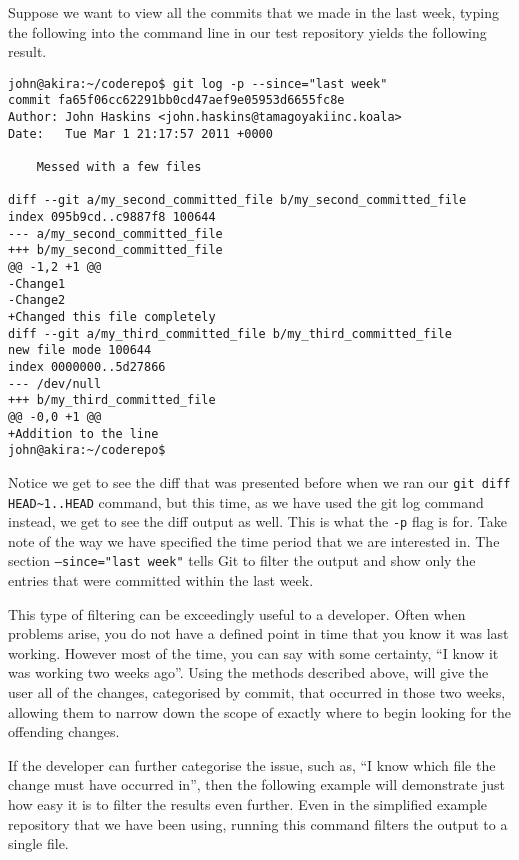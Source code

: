 Suppose we want to view all the commits that we made in the last week, typing the following into the command line in our test repository yields the following result.

\begin{Verbatim}[frame=leftline,framerule=1mm,fontsize=\relsize{-3}] 
john@akira:~/coderepo$ git log -p --since="last week"
commit fa65f06cc62291bb0cd47aef9e05953d6655fc8e
Author: John Haskins <john.haskins@tamagoyakiinc.koala>
Date:   Tue Mar 1 21:17:57 2011 +0000

    Messed with a few files

diff --git a/my_second_committed_file b/my_second_committed_file
index 095b9cd..c9887f8 100644
--- a/my_second_committed_file
+++ b/my_second_committed_file
@@ -1,2 +1 @@
-Change1
-Change2
+Changed this file completely
diff --git a/my_third_committed_file b/my_third_committed_file
new file mode 100644
index 0000000..5d27866
--- /dev/null
+++ b/my_third_committed_file
@@ -0,0 +1 @@
+Addition to the line
john@akira:~/coderepo$ 
\end{Verbatim}

Notice we get to see the diff that was presented before when we ran our \texttt{git diff HEAD\textasciitilde1..HEAD} command, but this time, as we have used the git log command instead, we get to see the diff output as well.  This is what the \texttt{-p} flag is for.  Take note of the way we have specified the time period that we are interested in.  The section \texttt{--since="last week"} tells Git to filter the output and show only the entries that were committed within the last week.

This type of filtering can be exceedingly useful to a developer.  Often when problems arise, you do not have a defined point in time that you know it was last working.  However most of the time, you can say with some certainty, ``I know it was working two weeks ago''.  Using the methods described above, will give the user all of the changes, categorised by commit, that occurred in those two weeks, allowing them to narrow down the scope of exactly where to begin looking for the offending changes.

If the developer can further categorise the issue, such as, ``I know which file the change must have occurred in'', then the following example will demonstrate just how easy it is to filter the results even further.  Even in the simplified example repository that we have been using, running this command filters the output to a single file.

